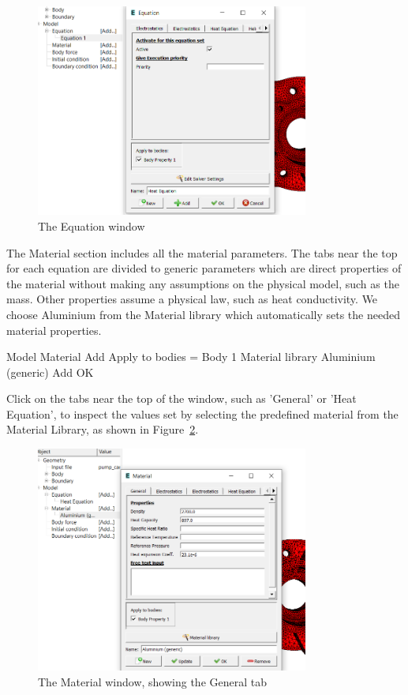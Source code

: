\begin{figure}[H]
\begin{center}
\includegraphics[width=0.8\textwidth]{step-02}
\caption{The Equation window}\label{fg:step-02}
\end{center}
\end{figure}

The Material section includes all the material parameters.  The tabs near the top for each equation are divided to generic parameters which are direct properties of the material without making any assumptions on the physical model, such as the mass. Other properties assume a physical law, such as heat conductivity.  We choose Aluminium from the Material library which automatically sets the needed material properties.

\ttbegin
Model
  Material
    Add 
      Apply to bodies = Body 1 
      Material library
        Aluminium (generic)
      Add 
      OK
\ttend

Click on the tabs near the top of the window, such as 'General' or 'Heat Equation', to inspect the values set by selecting the predefined material from the Material Library, as shown in Figure~\ref{fg:step-03}.

\begin{figure}[H]
\begin{center}
\includegraphics[width=0.8\textwidth]{step-03}
\caption{The Material window, showing the General tab}\label{fg:step-03}
\end{center}
\end{figure}


